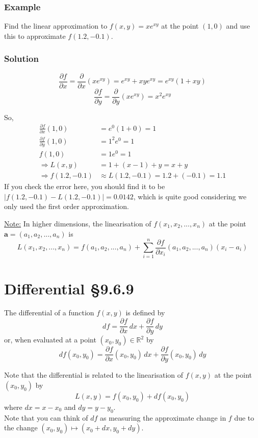 \documentclass[11pt]{article}
\newcommand{\reals}{\mathbb{R}}
\renewcommand{\vec}[1]{\mathbf{#1}}
\begin{document}
\subsubsection{Example}
Find the linear approximation to $f(x,y) = xe^{xy}$ at the point $(1, 0)$ and use this to approximate $f(1.2, -0.1)$.

\subsubsection{Solution}
\[ \frac{\partial f}{\partial x} = \frac{\partial}{\partial x}\left( x e^{xy}\right) = e^{xy} + xye^{xy} = e^{xy}(1 + xy) \]
\[ \frac{\partial f}{\partial y} = \frac{\partial}{\partial y}\left( xe^{xy} \right) = x^2 e^{xy} \]

So,
\begin{align*}
\frac{\partial f}{\partial x}(1, 0) &= e^0 ( 1 + 0) = 1 \\
\frac{\partial f}{\partial y}(1, 0) &= 1^2 e^0 = 1 \\
f(1, 0) &= 1 e^{0} = 1 \\
\Rightarrow L(x, y) &= 1 + (x-1) + y = x + y \\
\Rightarrow f(1.2, -0.1) &\approx L(1.2, -0.1) = 1.2 + (-0.1) = 1.1
\end{align*}
If you check the error here, you should find it to be $|f(1.2, -0.1) - L(1.2, -0.1)| = 0.0142$, which is quite good considering we only used the first order approximation.

\underline{Note:} In higher dimensions, the linearisation of $f(x_1, x_2, ..., x_n)$ at the point $\vec{a} = (a_1, a_2, ..., a_n)$ is
\[ L(x_1, x_2, ..., x_n) = f(a_1, a_2, ..., a_n) + \sum_{i=1}^n \frac{\partial f}{\partial x_i} (a_1, a_2, ..., a_n) (x_i - a_i) \]

\section{Differential §9.6.9}
The differential of a function $f(x, y)$ is defined by 
\[ df = \frac{\partial f}{\partial x}\, dx + \frac{\partial f}{\partial y}\, dy \]
or, when evaluated at a point $(x_0, y_0) \in \reals^2$ by
\[ df(x_0, y_0) = \frac{\partial f}{\partial x}(x_0, y_0)\, dx + \frac{\partial f}{\partial y}(x_0, y_0)\, dy \]

Note that the differential is related to the linearisation of $f(x, y)$ at the point $(x_0, y_0)$ by
\[ L(x, y) = f(x_0, y_0) + df(x_0, y_0) \]
where $dx = x - x_0$ and $dy = y - y_0$.\\
Note that you can think of $df$ as measuring the approximate change in $f$ due to the change $(x_0, y_0) \mapsto (x_0 + dx, y_0 + dy)$.
\end{document}
